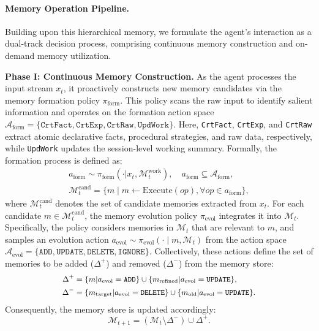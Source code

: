 \documentclass[11pt, a4paper]{lumia}
\begin{document}
\paragraph{Memory Operation Pipeline.}
Building upon this hierarchical memory, we formulate the agent’s interaction as a dual-track decision process, comprising continuous memory construction and on-demand memory utilization.

\noindent \textbf{Phase I: Continuous Memory Construction.}
As the agent processes the input stream $x_t$, it proactively constructs new memory candidates via the memory formation policy $\pi_{\text{form}}$. 
This policy scans the raw input to identify salient information and operates on the formation action space $\mathcal{A}_{\text{form}}=\{\texttt{CrtFact}, \texttt{CrtExp}, \texttt{CrtRaw}, \texttt{UpdWork}\}$. Here, \texttt{CrtFact}, \texttt{CrtExp}, and \texttt{CrtRaw} extract atomic declarative facts, procedural strategies, and raw data, respectively, while \texttt{UpdWork} updates the session-level working summary.
Formally, the formation process is defined as:
\begin{equation}
\begin{aligned}
a_{\text{form}} \sim \pi_{\text{form}}(\cdot | x_t, \mathcal{M}^{\text{work}}_t), \quad a_{\text{form}} \subseteq \mathcal{A}_{\text{form}}, \\
\mathcal{M}_t^{\text{cand}} = \{ m \mid m \leftarrow \text{Execute}(op), \forall op \in a_{\text{form}} \},
\end{aligned}
\end{equation}
where $\mathcal{M}_t^{\text{cand}}$ denotes the set of candidate memories extracted from $x_t$. For each candidate $m \in \mathcal{M}_t^{\text{cand}}$, the memory evolution policy $\pi_{\text{evol}}$ integrates it into $\mathcal{M}_{t}$.
Specifically, the policy considers memories in $\mathcal{M}_{t}$ that are relevant to $m$, and samples an evolution action $a_{\text{evol}} \sim \pi_{\text{evol}}(\cdot \mid m, \mathcal{M}_t)$ from the action space $\mathcal{A}_{\text{evol}}=\{\texttt{ADD}, \texttt{UPDATE}, \texttt{DELETE}, \texttt{IGNORE}\}$.
Collectively, these actions define the set of memories to be added ($\Delta^+$) and removed ($\Delta^-$) from the memory store:
\begin{equation}
\small
\begin{aligned}
    \Delta^+ &= \{ m | a_{\text{evol}} = \texttt{ADD} \} \cup \{ m_{\text{refined}} | a_{\text{evol}} = \texttt{UPDATE} \}, \\
    \Delta^- &= \{ m_{\text{target}} | a_{\text{evol}} = \texttt{DELETE} \} \cup \{ m_{\text{old}} | a_{\text{evol}} = \texttt{UPDATE} \}.
\end{aligned}
\end{equation}
Consequently, the memory store is updated accordingly:
\begin{equation}
\mathcal{M}_{t+1} = (\mathcal{M}_t \setminus \Delta^-) \cup \Delta^+.
\end{equation}
\end{document}
